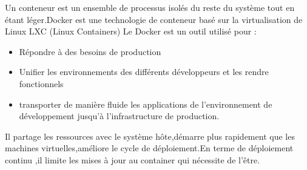 \vspace{0.5cm}
Un conteneur est un ensemble de processus isolés du reste du système tout en étant léger.Docker est une technologie de conteneur basé sur la virtualisation de Linux LXC (Linux Containers)
\vspace{0.5cm}
Le Docker est un outil utilisé pour :
\begin{itemize}
	\item Répondre à des besoins de production
	\item Unifier les environnements des différents développeurs et les rendre fonctionnels
	\item transporter de manière fluide les applications de l’environnement de développement jusqu’à l’infrastructure de production.
\end{itemize}
Il partage les ressources avec le système hôte,démarre plus rapidement que les machines virtuelles,améliore le cycle de déploiement.En terme de déploiement continu ,il limite les mises à jour au container qui nécessite de l'être.
